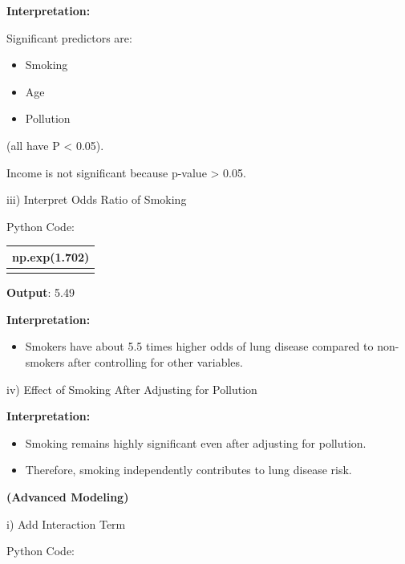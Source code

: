 \documentclass[
]{article}
\newcounter{none} %
\begin{document}
\textbf{Interpretation:}

Significant predictors are:

\begin{itemize}
\item
  Smoking
\item
  Age
\item
  Pollution
\end{itemize}

(all have P \textless{} 0.05).

Income is not significant because p-value \textgreater{} 0.05.

iii) Interpret Odds Ratio of Smoking

Python Code:

{\def\LTcaptype{none} %
\begin{longtable}[]{@{}
  >{\raggedright\arraybackslash}p{}@{}}
\toprule\noalign{}
\begin{minipage}[b]{\linewidth}\raggedright
np.exp(1.702)
\end{minipage} \\
\midrule\noalign{}
\endhead
\bottomrule\noalign{}
\endlastfoot
\end{longtable}
}

\textbf{Output}: 5.49

\textbf{Interpretation:}

\begin{itemize}
\item
  Smokers have about 5.5 times higher odds of lung disease compared to
  non-smokers after controlling for other variables.
\end{itemize}

iv) Effect of Smoking After Adjusting for Pollution

\textbf{Interpretation:}

\begin{itemize}
\item
  Smoking remains highly significant even after adjusting for pollution.
\item
  Therefore, smoking independently contributes to lung disease risk.
\end{itemize}

\textbf{(Advanced Modeling)}

i) Add Interaction Term

Python Code:
\end{document}
